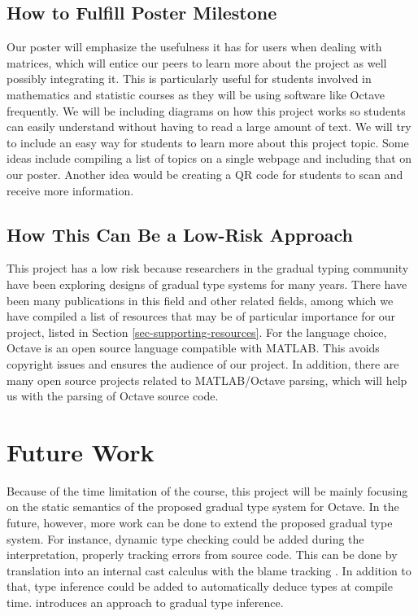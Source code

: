 \subsection{How to Fulfill Poster Milestone}
Our poster will emphasize the usefulness it has for users when dealing with
matrices, which will entice our peers to learn more about the project as well
possibly integrating it. This is particularly useful for students involved in
mathematics and statistic courses as they will be using software like Octave
frequently. We will be including diagrams on how this project works so students
can easily understand without having to read a large amount of text. We will try
to include an easy way for students to learn more about this project topic. Some
ideas include compiling a list of topics on a single webpage and including that
on our poster. Another idea would be creating a QR code for students to scan and
receive more information.

\subsection{How This Can Be a Low-Risk Approach}
This project has a low risk because researchers in the gradual typing community
have been exploring designs of gradual type systems for many years. There have
been many publications in this field and other related fields, among which we
have compiled a list of resources that may be of particular importance for our
project, listed in Section \ref{sec-supporting-resources}. For the language choice,
Octave is an open source language compatible with MATLAB. This avoids copyright
issues and ensures the audience of our project. In addition, there are many open
source projects related to MATLAB/Octave parsing, which will help us with the
parsing of Octave source code.

\section{Future Work}
\label{sec-future-work}
Because of the time limitation of the course, this project will be mainly
focusing on the static semantics of the proposed gradual type system for Octave.
In the future, however, more work can be done to extend the proposed gradual
type system. For instance, dynamic type checking could be added during the
interpretation, properly tracking errors from source code. This can be done by
translation into an internal cast calculus with the blame tracking
\cite{siek2015refined}. In addition to that, type inference could be added to
automatically deduce types at compile time. \cite{garcia2015principal}
introduces an approach to gradual type inference.

